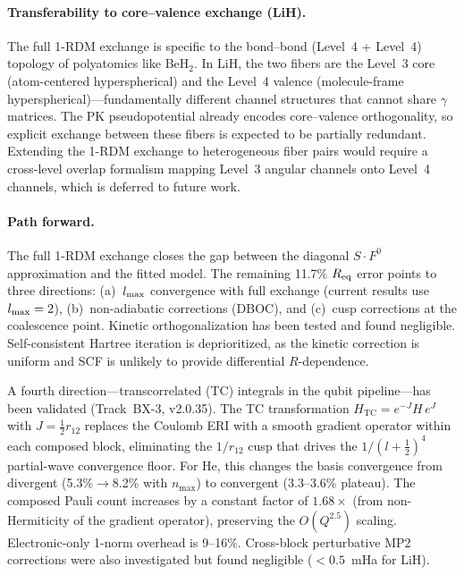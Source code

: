 \documentclass[aps,pra,twocolumn,superscriptaddress,longbibliography,floatfix]{revtex4-2}
\begin{document}
\paragraph{Transferability to core--valence exchange (LiH).}
The full 1-RDM exchange is specific to the bond--bond (Level~4 +
Level~4) topology of polyatomics like BeH$_2$.  In LiH, the two
fibers are the Level~3 core (atom-centered hyperspherical) and
the Level~4 valence (molecule-frame hyperspherical)---fundamentally
different channel structures that cannot share $\gamma$ matrices.
The PK pseudopotential already encodes core--valence orthogonality,
so explicit exchange between these fibers is expected to be
partially redundant.  Extending the 1-RDM exchange to heterogeneous
fiber pairs would require a cross-level overlap formalism mapping
Level~3 angular channels onto Level~4 channels, which is deferred
to future work.

\paragraph{Path forward.}
The full 1-RDM exchange closes the gap between the diagonal
$S \cdot F^0$ approximation and the fitted model.  The remaining
11.7\% $R_{\rm eq}$ error points to three directions: (a)~$l_{\rm max}$
convergence with full exchange (current results use $l_{\rm max} = 2$),
(b)~non-adiabatic corrections (DBOC), and (c)~cusp corrections at the
coalescence point.  Kinetic orthogonalization has been tested and found
negligible.  Self-consistent Hartree iteration is deprioritized, as
the kinetic correction is uniform and SCF is unlikely to provide
differential $R$-dependence.

A fourth direction---transcorrelated (TC) integrals in the qubit
pipeline---has been validated (Track~BX-3, v2.0.35).  The TC
transformation $H_{\mathrm{TC}} = e^{-J} H\, e^{J}$ with
$J = \tfrac{1}{2}r_{12}$ replaces the Coulomb ERI with a smooth
gradient operator within each composed block, eliminating the
$1/r_{12}$ cusp that drives the $1/(l+\tfrac{1}{2})^4$ partial-wave
convergence floor.  For He, this changes the basis convergence from
divergent (5.3\%$\to$8.2\% with $n_{\max}$) to convergent
(3.3--3.6\% plateau).  The composed Pauli count increases by a
constant factor of $1.68\times$ (from non-Hermiticity of the gradient
operator), preserving the $O(Q^{2.5})$ scaling.  Electronic-only
1-norm overhead is 9--16\%.  Cross-block perturbative MP2 corrections
were also investigated but found negligible ($< 0.5$~mHa for LiH).
\end{document}
